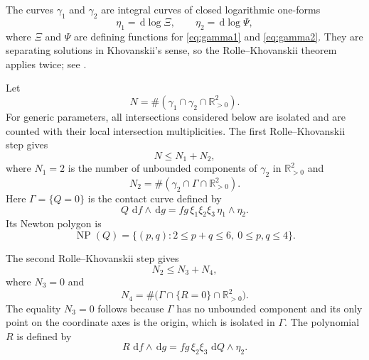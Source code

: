 \documentclass[10pt,reqno]{amsart}
\numberwithin{equation}{section}
\theoremstyle{plain}
\theoremstyle{remark}
\newcommand{\R}{\mathbb{R}}
\newcommand{\dd}{\,\mathrm{d}}
\newcommand{\NP}{\operatorname{NP}}
\newcommand{\Qpos}{\R_{>0}^{2}}
\begin{document}
The curves $\gamma_1$ and $\gamma_2$ are integral curves of closed
logarithmic one-forms
\begin{equation}\label{eq:eta12}
  \eta_1=\dd\log\Xi,
  \qquad
  \eta_2=\dd\log\Psi,
\end{equation}
where $\Xi$ and $\Psi$ are defining functions for \eqref{eq:gamma1} and
\eqref{eq:gamma2}.  They are separating solutions in Khovanskii's sense,
so the Rolle--Khovanskii theorem applies twice; see
\cite{GNS,Khovanskii}.

Let
\begin{equation}\label{eq:N}
  N=\#(\gamma_1\cap\gamma_2\cap\Qpos).
\end{equation}
For generic parameters, all intersections considered below are isolated and
are counted with their local intersection multiplicities.  The first
Rolle--Khovanskii step gives
\begin{equation}\label{eq:first-rolle}
  N\leq N_1+N_2,
\end{equation}
where $N_1=2$ is the number of unbounded components of $\gamma_2$ in
$\Qpos$ and
\begin{equation}\label{eq:N2}
  N_2=\#(\gamma_2\cap\Gamma\cap\Qpos).
\end{equation}
Here $\Gamma=\{Q=0\}$ is the contact curve defined by
\begin{equation}\label{eq:def-Q}
  Q\,\dd f\wedge\dd g
  =fg\,\xi_1\xi_2\xi_3\,\eta_1\wedge\eta_2.
\end{equation}
Its Newton polygon is
\begin{equation}\label{eq:NPQ}
  \NP(Q)=\{(p,q):2\leq p+q\leq6,\ 0\leq p,q\leq4\}.
\end{equation}

The second Rolle--Khovanskii step gives
\begin{equation}\label{eq:second-rolle}
  N_2\leq N_3+N_4,
\end{equation}
where $N_3=0$ and
\begin{equation}\label{eq:N4}
  N_4=\#\bigl(\Gamma\cap\{R=0\}\cap\Qpos\bigr).
\end{equation}
The equality $N_3=0$ follows because $\Gamma$ has no unbounded
component and its only point on the coordinate axes is the origin, which
is isolated in $\Gamma$.  The polynomial $R$ is defined by
\begin{equation}\label{eq:def-R}
  R\,\dd f\wedge\dd g
  =fg\,\xi_2\xi_3\,\dd Q\wedge\eta_2.
\end{equation}
\end{document}
